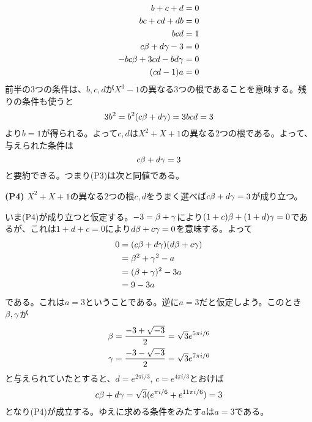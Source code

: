 \begin{sol}
\begin{description}
  \begin{align*}
    b+c+d&=0 \\
    bc+cd+db &= 0 \\
    bcd &= 1 \\
    c\beta + d{\gamma} - 3 &= 0 \\
    -bc\beta + 3cd - bd {\gamma} &= 0 \\
    (cd-1)a &= 0
  \end{align*}
  前半の$3$つの条件は、$b,c,d$が$X^3-1$の異なる$3$つの根であることを意味する。残りの条件も使うと
  \[
  3b^2 =  b^2(c\beta +d{\gamma}) = 3bcd = 3
  \]
  より$b=1$が得られる。よって$c,d$は$X^2 + X + 1$の異なる$2$つの根である。よって、与えられた条件は
  \[
  c\beta + d{\gamma} = 3
  \]
  と要約できる。つまり(P3)は次と同値である。
  \begin{oframed}
    \textbf{(P4)} \quad $X^2+X+1$の異なる$2$つの根$c,d$をうまく選べば$c\beta + d{\gamma} = 3$が成り立つ。
  \end{oframed}
  いま(P4)が成り立つと仮定する。$-3 = \beta + {\gamma}$により$(1+c)\beta + (1+d){\gamma} = 0$であるが、これは$1+d+c=0$により$d\beta + c{\gamma}=0$を意味する。よって
  \begin{align*}
    0 &= (c\beta + d{\gamma} )( d\beta + c{\gamma}) \\
    &= \beta^2 + {\gamma}^2 - a \\
    &= (\beta + {\gamma})^2 - 3a \\
    &= 9 -3a
  \end{align*}
  である。これは$a=3$ということである。逆に$a=3$だと仮定しよう。このとき$\beta,{\gamma}$が
  \begin{align*}
    \beta &= \frac{-3 + \sqrt{-3}}{2} = \sqrt{3} e^{5\pi i/6} \\
        {\gamma} &= \frac{-3 - \sqrt{-3}}{2} = \sqrt{3} e^{7 \pi i/6}
  \end{align*}
  と与えられていたとすると、$d = e^{2\pi i/3}$, $c = e^{4\pi i/3}$とおけば
  \[
  c\beta + d{\gamma} = \sqrt{3} ( e^{\pi i/6}  +  e^{11 \pi i/6} ) = 3
  \]
  となり(P4)が成立する。ゆえに求める条件をみたす$a$は$a=3$である。
  \end{description}
\end{sol}
